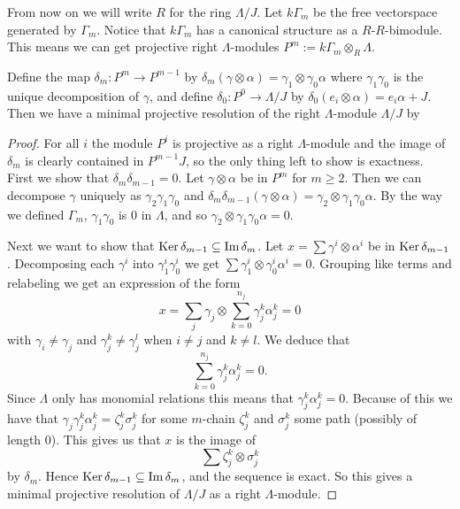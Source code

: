 From now on we will write $R$ for the ring $\Lambda/J$. Let $k\Gamma_m$ be the free vectorspace generated by $\Gamma_m$. Notice that $k\Gamma_m$ has a canonical structure as a $R$-$R$-bimodule. This means we can get projective right $\Lambda$-modules $P^m := k\Gamma_m\otimes_R\Lambda$.

\begin{prop}
Define the map $\delta_m \colon P^m \to P^{m-1}$ by $\delta_m(\gamma \otimes \alpha) = \gamma_1 \otimes \gamma_0\alpha$ where $\gamma_1\gamma_0$ is the unique decomposition of $\gamma$, and define $\delta_0 \colon P^0 \to \Lambda /J$ by $\delta_0(e_i\otimes \alpha) = e_i\alpha + J$. Then we have a minimal projective resolution of the right $\Lambda$-module $\Lambda/J$ by

\begin{center}
\end{center}

\begin{proof}
	For all $i$ the module $P^i$ is projective as a right $\Lambda$-module and the image of $\delta_m$ is clearly contained in $P^{m-1}J$, so the only thing left to show is exactness. First we show that $\delta_m\delta_{m-1}=0$. Let $\gamma\otimes \alpha$ be in $P^m$ for $m \geq 2$. Then we can decompose $\gamma$ uniquely as $\gamma_2\gamma_1\gamma_0$ and $\delta_m\delta_{m-1}(\gamma\otimes \alpha) = \gamma_2\otimes\gamma_1\gamma_0\alpha$. By the way we defined $\Gamma_m$, $\gamma_1\gamma_0$ is 0 in $\Lambda$, and so $\gamma_2\otimes\gamma_1\gamma_0\alpha = 0$.
	
	Next we want to show that $\operatorname{Ker}\delta_{m-1} \subseteq \operatorname{Im}\delta_m$. Let $x = \sum \gamma^i\otimes \alpha^i$ be in $\operatorname{Ker}\delta_{m-1}$.  Decomposing each $\gamma^i$ into $\gamma_1^i\gamma_0^i$ we get $\sum \gamma_1^i \otimes \gamma_0^i\alpha^i=0$. Grouping like terms and relabeling we get an expression of the form 
	$$x = \sum_j \gamma_j \otimes \sum_{k=0}^{n_j} \gamma_j^{k}\alpha_j^{k}=0$$ 
	with $\gamma_i \neq \gamma_j$ and $\gamma_j^k \neq \gamma_j^l$ when $i\neq j$ and $k\neq l$. We deduce that 
	$$\sum_{k=0}^{n_j} \gamma_j^{k}\alpha_j^{k}=0.$$ 
	Since $\Lambda$ only has monomial relations this means that $\gamma_j^{k}\alpha_j^{k}=0$. Because of this we have that $\gamma_j\gamma_j^{k}\alpha_j^{k}=\zeta_j^k\sigma_j^k$ for some $m$-chain $\zeta_j^k$ and $\sigma_j^k$ some path (possibly of length 0). This gives us that $x$ is the image of $$\sum \zeta_j^k\otimes \sigma_j^k$$ 
	by $\delta_m$. Hence $\operatorname{Ker}\delta_{m-1} \subseteq \operatorname{Im}\delta_m$, and the sequence is exact. So this gives a minimal projective resolution of $\Lambda/J$ as a right $\Lambda$-module.
\end{proof}
\end{prop}

